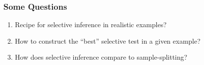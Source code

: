 \begin{frame}
  \frametitle{Some Questions}
  
  \begin{enumerate}
    \item Recipe for selective inference in realistic examples?
    \item How to construct the ``best'' selective test in a given example?
    \item How does selective inference compare to sample-splitting?
  \end{enumerate}
  

\end{frame}

